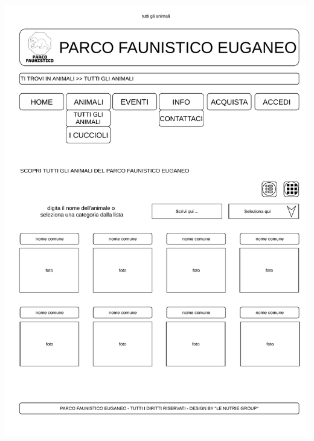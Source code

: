 \begin{center}
\begin{minipage}{0.4\linewidth}
        \end{minipage}%
        \hfill
        \begin{minipage}{0.4\linewidth}
            \includegraphics[width=\linewidth]{./../docs/Analisi/bozze/animali-grid.pdf}
        \end{minipage}
        \hfill
        \begin{minipage}{0.4\linewidth}

\end{minipage}
\end{center}

